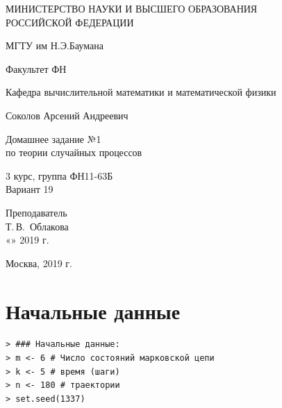 \documentclass[14pt,a4paper]{scrartcl}
\begin{document}
	\begin{titlepage}
	\begin{center}
		\large
		МИНИСТЕРСТВО НАУКИ И ВЫСШЕГО ОБРАЗОВАНИЯ\\ РОССИЙСКОЙ ФЕДЕРАЦИИ
		
		\vspace{0.5cm}
		
		МГТУ им Н.Э.Баумана
		\vspace{0.25cm}
		
		Факультет ФН
		
		Кафедра вычислительной математики и математической физики
		\vfill
		
		
		Соколов Арсений Андреевич\\
		\vfill
		
		
		{\LARGE Домашнее задание №1 \\ по теории случайных процессов\\[2mm]
		}
		\bigskip
		
		3 курс, группа ФН11-63Б\\
		Вариант 19
	\end{center}
	\vfill
	
	\newlength{\ML}
	\hfill\begin{minipage}{0.4\textwidth}
		Преподаватель\\
		\underline{\hspace{3cm}} Т.\,В.~Облакова\\
		«\underline{\hspace{0.7cm}}» \underline{\hspace{1.71cm}} 2019 г.
	\end{minipage}%
	\bigskip
	
	
	\vfill
	
	\begin{center}
		Москва, 2019 г.
	\end{center}
\end{titlepage}

\section*{Начальные данные}

\begin{verbatim}
> ### Начальные данные:
> m <- 6 # Число состояний марковской цепи
> k <- 5 # время (шаги)
> n <- 180 # траектории
> set.seed(1337)
\end{verbatim}
\end{document}
